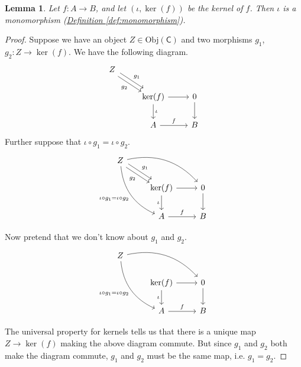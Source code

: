 \documentclass[a4paper,10pt]{scrreprt}
\newcommand{\Obj}{\mathrm{Obj}}
\theoremstyle{definition}
\theoremstyle{plain}
\newtheorem{lemma}{Lemma}[section]
\theoremstyle{remark}
\begin{document}
\begin{lemma}
  \label{lemma:canonicalinjectionismono}
  Let $f\colon A \to B$, and let $(\iota, \ker(f))$ be the kernel of $f$. Then $\iota$ is a monomorphism (\hyperref[def:monomorphism]{Definition \ref*{def:monomorphism}}).
\end{lemma}
\begin{proof}
  Suppose we have an object $Z \in \Obj(\mathsf{C})$ and two morphisms $g_{1}$, $g_{2}\colon Z \to \ker(f)$. We have the following diagram.
  \begin{equation*}
    \begin{tikzcd}
      Z
      \arrow[rd, shift left, "g_{1}"]
      \arrow[rd, shift right, swap, "g_{2}"]
      \\
      & \ker(f)
      \arrow[r]
      \arrow[d, "\iota"]
      & 0
      \arrow[d]
      \\
      & A
      \arrow[r, "f"]
      & B
    \end{tikzcd}
  \end{equation*}
  Further suppose that $\iota \circ g_{1} = \iota \circ g_{2}$.
  \begin{equation*}
    \begin{tikzcd}
      Z
      \arrow[rd, shift left, "g_{1}"]
      \arrow[rd, shift right, swap, "g_{2}"]
      \arrow[rrd, bend left]
      \arrow[rdd, bend right, swap, "\iota \circ g_{1} = \iota \circ g_{2}"]
      \\
      & \ker(f)
      \arrow[r]
      \arrow[d, swap, "\iota"]
      & 0
      \arrow[d]
      \\
      & A
      \arrow[r, "f"]
      & B
    \end{tikzcd}
  \end{equation*}

  Now pretend that we don't know about $g_{1}$ and $g_{2}$.
  \begin{equation*}
    \begin{tikzcd}
      Z
      \arrow[rrd, bend left]
      \arrow[rdd, bend right, swap, "\iota \circ g_{1} = \iota \circ g_{2}"]
      \\
      & \ker(f)
      \arrow[r]
      \arrow[d, swap, "\iota"]
      & 0
      \arrow[d]
      \\
      & A
      \arrow[r, "f"]
      & B
    \end{tikzcd}
  \end{equation*}

  The universal property for kernels tells us that there is a unique map $Z \to \ker(f)$ making the above diagram commute. But since $g_{1}$ and $g_{2}$ both make the diagram commute, $g_{1}$ and $g_{2}$ must be the same map, i.e. $g_{1} = g_{2}$.
\end{proof}
\end{document}
